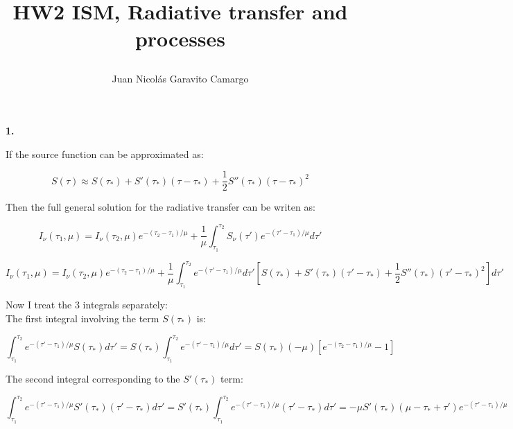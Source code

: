 \documentclass[12pt]{article}
\title{\begin{LARGE}
{HW2 ISM, Radiative transfer and processes}
\end{LARGE}}
\author{Juan Nicol\'as Garavito Camargo}
\begin{document}
\maketitle


\begin{LARGE}
\textbf{1.}
\end{LARGE}

If the source function can be approximated as: 

\begin{equation}\label{approx}
S(\tau) \approx S(\tau_{*}) + S'(\tau_*)(\tau - \tau_*) + \dfrac{1}{2}S''(\tau_*)(\tau-\tau_*)^2	
\end{equation}

Then the full general solution for the radiative transfer can be writen as:

\begin{equation}\label{sol}
I_{\nu}(\tau_1, \mu) = I_{\nu}(\tau_2, \mu) e^{-(\tau_2 - \tau_1)/\mu} + \dfrac{1}{\mu}\int_{\tau_1}^{\tau_2}S_{\nu}(\tau ')e^{-(\tau ' - \tau_1)/\mu} d\tau '
\end{equation}

\begin{equation}
I_{\nu}(\tau_1, \mu) = I_{\nu}(\tau_2, \mu) e^{-(\tau_2 - \tau_1)/\mu} + 
\dfrac{1}{\mu} \int_{\tau_1}^{\tau_2} e^{-(\tau ' - \tau_1)/\mu} d\tau ' 
\left[  S(\tau_{*}) + S'(\tau_*)(\tau ' - \tau_*) + \dfrac{1}{2}S''(\tau_*)(\tau '-\tau_*)^2 \right] d\tau '
\end{equation}

Now I treat the 3 integrals separately:\\

The first integral involving the term $S(\tau_*)$ is:

\begin{equation}\label{int1}
\int_{\tau_1}^{\tau_2}e^{-(\tau ' - \tau_1)/\mu} S(\tau_*) d\tau ' =
S(\tau_*)\int_{\tau_1}^{\tau_2}e^{-(\tau' - \tau_1)/\mu} d\tau ' = S(\tau_*) (-\mu) \left[ e^{-(\tau_2 - \tau_1)/\mu} - 1 \right]
\end{equation}

The second integral corresponding to the $S'(\tau_*)$ term:

\begin{equation*}
\int_{\tau_1}^{\tau_2}e^{-(\tau ' - \tau_1)/\mu} S'(\tau_*)(\tau ' - \tau_*) d\tau ' = S'(\tau_*) \int_{\tau_1}^{\tau_2}e^{-(\tau ' - \tau_1)/\mu} (\tau ' - \tau_*)
d\tau ' = -\mu S'(\tau_*)(\mu - \tau_* + \tau')e^{-(\tau ' - \tau_1)/\mu}
\end{equation*}
\end{document}
